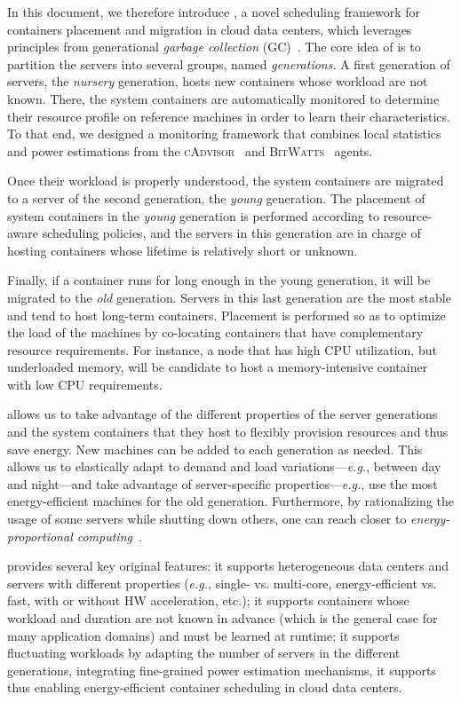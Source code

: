 In this document, we therefore introduce \GP, a novel scheduling framework for containers placement and migration in cloud data centers, which leverages principles from generational \emph{garbage collection} (GC)~\cite{Ungar:1984:GSN:390011.808261,Lieberman:1983:RGC:358141.358147}.
The core idea of \GP is to partition the servers into several groups, named \emph{generations}.
A first generation of servers, the \emph{nursery} generation, hosts new containers whose workload are not known.
There, the system containers are automatically monitored to determine their resource profile on reference machines in order to learn their characteristics.
To that end, we designed a monitoring framework that combines local statistics and power estimations from the \textsc{cAdvisor}~\cite{cAdvisor} and \textsc{BitWatts}~\cite{DBLP:conf/eurosys/ColmantKFHRS15} agents.

Once their workload is properly understood, the system containers are migrated to a server of the second generation, the \emph{young} generation.
The placement of system containers in the \emph{young} generation is performed according to resource-aware scheduling policies, and the servers in this generation are in charge of hosting containers whose lifetime is relatively short or unknown.

Finally, if a container runs for long enough in the young generation, it will be migrated to the \emph{old} generation.
Servers in this last generation are the most stable and tend to host long-term containers.
Placement is performed so as to optimize the load of the machines by co-locating containers that have complementary resource requirements.
For instance, a node that has high CPU utilization, but underloaded memory, will be candidate to host a memory-intensive container with low CPU requirements.

\GP allows us to take advantage of the different properties of the server generations and the system containers that they host to flexibly provision resources and thus save energy.
New machines can be added to each generation as needed.
This allows us to elastically adapt to demand and load variations---\textit{e.g.}, between day and night---and take advantage of server-specific properties---\textit{e.g.}, use the most energy-efficient machines for the old generation.
Furthermore, by rationalizing the usage of some servers while shutting down others, one can reach closer to \emph{energy-proportional computing}~\cite{Barroso:2007:Energy:Proportional:Computing}.

\GP provides several key original features: it supports heterogeneous data centers and servers with different properties (\textit{e.g.}, single- vs. multi-core, energy-efficient vs. fast, with or without HW acceleration, etc.); it supports containers whose workload and duration are not known in advance (which is the general case for many application domains) and must be learned at runtime; it supports fluctuating workloads by adapting the number of servers in the different generations, integrating fine-grained power estimation mechanisms, it supports thus enabling energy-efficient container scheduling in cloud data centers.

